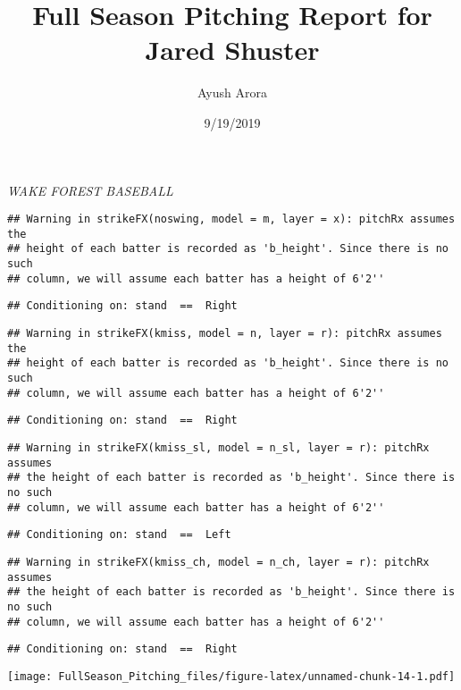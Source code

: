 \documentclass[]{article}
\title{Full Season Pitching Report for Jared Shuster}
\author{Ayush Arora}
\date{9/19/2019}
\begin{document}
\maketitle

\emph{WAKE FOREST BASEBALL}

\begin{verbatim}
## Warning in strikeFX(noswing, model = m, layer = x): pitchRx assumes the
## height of each batter is recorded as 'b_height'. Since there is no such
## column, we will assume each batter has a height of 6'2''
\end{verbatim}

\begin{verbatim}
## Conditioning on: stand  ==  Right
\end{verbatim}

\begin{verbatim}
## Warning in strikeFX(kmiss, model = n, layer = r): pitchRx assumes the
## height of each batter is recorded as 'b_height'. Since there is no such
## column, we will assume each batter has a height of 6'2''
\end{verbatim}

\begin{verbatim}
## Conditioning on: stand  ==  Right
\end{verbatim}

\begin{verbatim}
## Warning in strikeFX(kmiss_sl, model = n_sl, layer = r): pitchRx assumes
## the height of each batter is recorded as 'b_height'. Since there is no such
## column, we will assume each batter has a height of 6'2''
\end{verbatim}

\begin{verbatim}
## Conditioning on: stand  ==  Left
\end{verbatim}

\begin{verbatim}
## Warning in strikeFX(kmiss_ch, model = n_ch, layer = r): pitchRx assumes
## the height of each batter is recorded as 'b_height'. Since there is no such
## column, we will assume each batter has a height of 6'2''
\end{verbatim}

\begin{verbatim}
## Conditioning on: stand  ==  Right
\end{verbatim}

\texttt{[image: FullSeason\_Pitching\_files/figure-latex/unnamed-chunk-14-1.pdf]}
\end{document}
